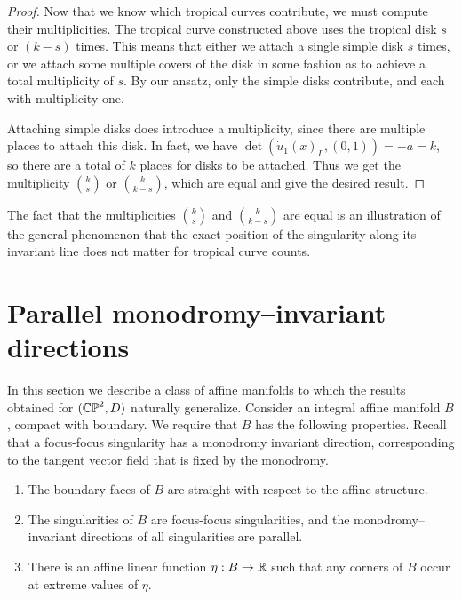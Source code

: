 \documentclass[12pt]{amsart}
\begin{document}
\begin{proof}
Now that we know which tropical curves contribute, we must compute
their multiplicities. The tropical curve constructed above uses the
tropical disk $s$ or $(k-s)$ times. This means that either we attach a single
simple disk $s$ times, or we attach some multiple covers of the disk
in some fashion as to achieve a total multiplicity of $s$. By our ansatz, only the simple disks contribute, and each with multiplicity one.

Attaching simple disks does introduce a multiplicity, since there are
multiple places to attach this disk. In fact, we have
$\det(\dot{u}_1(x)_L,(0,1)) = -a = k$, so there are a total of $k$
places for disks to be attached. Thus we get the multiplicity
$\binom{k}{s}$ or $\binom{k}{k-s}$, which are equal and give the
desired result.

\end{proof} 

\begin{remark}
The fact that the multiplicities $\binom{k}{s}$ and
$\binom{k}{k-s}$ are equal is an illustration of the general
phenomenon that the exact position of the singularity along its
invariant line does not matter for tropical curve counts.  
\end{remark}

\section{Parallel monodromy--invariant directions}
\label{sec:other-manifolds}

In this section we describe a class of affine manifolds to which the
results obtained for $(\mathbb{CP}^2,D)$ naturally generalize. Consider an
integral affine manifold $B$, compact with boundary. We require that
$B$ has the following properties. Recall that a focus-focus
singularity has a monodromy invariant direction, corresponding to the
tangent vector field that is fixed by the monodromy.
\begin{enumerate}
\item The boundary faces of $B$ are straight with respect to the
  affine structure.
\item The singularities of $B$ are focus-focus singularities, and the monodromy--invariant directions of all singularities are parallel.
\item There is an affine linear function $\eta: B \to \mathbb{R}$ such that any corners of $B$ occur at extreme values of $\eta$.
\end{enumerate}
\end{document}
